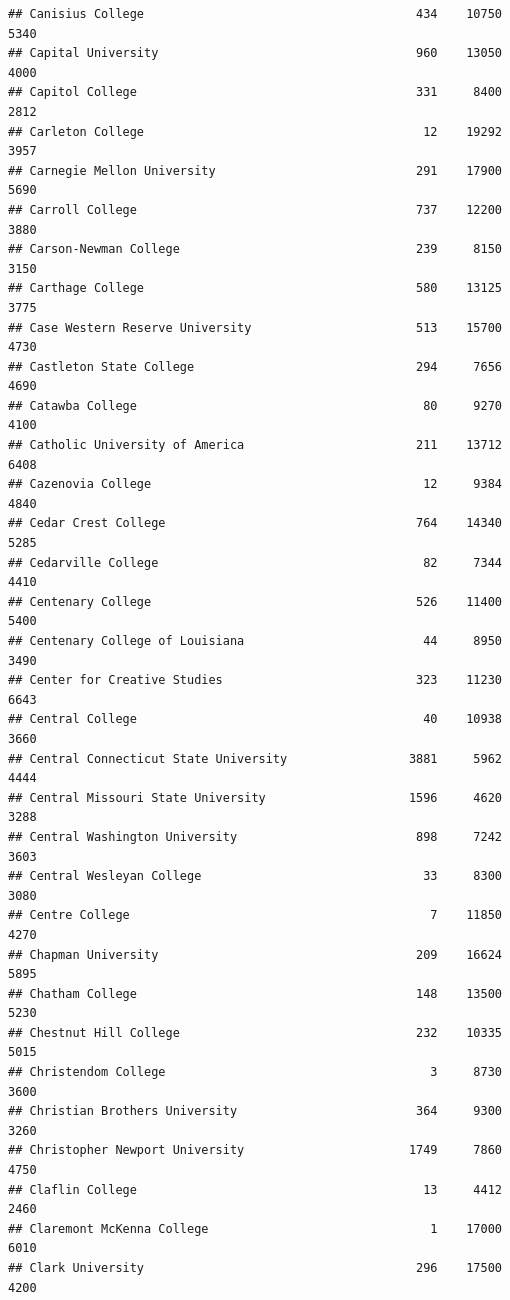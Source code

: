 \documentclass[
]{article}
\begin{document}
\begin{verbatim}
## Canisius College                                      434    10750       5340
## Capital University                                    960    13050       4000
## Capitol College                                       331     8400       2812
## Carleton College                                       12    19292       3957
## Carnegie Mellon University                            291    17900       5690
## Carroll College                                       737    12200       3880
## Carson-Newman College                                 239     8150       3150
## Carthage College                                      580    13125       3775
## Case Western Reserve University                       513    15700       4730
## Castleton State College                               294     7656       4690
## Catawba College                                        80     9270       4100
## Catholic University of America                        211    13712       6408
## Cazenovia College                                      12     9384       4840
## Cedar Crest College                                   764    14340       5285
## Cedarville College                                     82     7344       4410
## Centenary College                                     526    11400       5400
## Centenary College of Louisiana                         44     8950       3490
## Center for Creative Studies                           323    11230       6643
## Central College                                        40    10938       3660
## Central Connecticut State University                 3881     5962       4444
## Central Missouri State University                    1596     4620       3288
## Central Washington University                         898     7242       3603
## Central Wesleyan College                               33     8300       3080
## Centre College                                          7    11850       4270
## Chapman University                                    209    16624       5895
## Chatham College                                       148    13500       5230
## Chestnut Hill College                                 232    10335       5015
## Christendom College                                     3     8730       3600
## Christian Brothers University                         364     9300       3260
## Christopher Newport University                       1749     7860       4750
## Claflin College                                        13     4412       2460
## Claremont McKenna College                               1    17000       6010
## Clark University                                      296    17500       4200

\end{verbatim}
\end{document}
